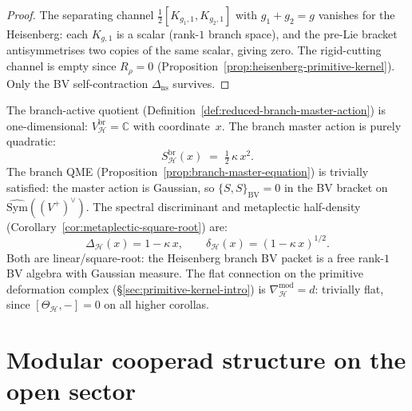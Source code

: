 \begin{proof}
The separating channel
$\frac{1}{2}[K_{g_1,1}, K_{g_2,1}]$ with $g_1 + g_2 = g$
vanishes for the Heisenberg: each $K_{g,1}$ is a scalar
(rank-$1$ branch space), and the pre-Lie bracket antisymmetrises
two copies of the same scalar, giving zero. The rigid-cutting
channel is empty since $R_\rho = 0$
(Proposition~\ref{prop:heisenberg-primitive-kernel}). Only the
BV self-contraction $\Delta_{\mathrm{ns}}$ survives.
\end{proof}

\begin{computation}
\label{comp:heisenberg-branch-bv}
The branch-active quotient
\textup{(}Definition~\textup{\ref{def:reduced-branch-master-action})}
is one-dimensional: $V_{\mathcal{H}}^{\mathrm{br}} = \mathbb{C}$
with coordinate~$x$. The branch master action is purely quadratic:
\begin{equation}\label{eq:heisenberg-branch-action}
S_{\mathcal{H}}^{\mathrm{br}}(x)
\;=\;
\tfrac{1}{2}\,\kappa\,x^2.
\end{equation}
The branch QME
\textup{(}Proposition~\textup{\ref{prop:branch-master-equation})}
is trivially satisfied: the master action is Gaussian, so
$\{S,S\}_{\mathrm{BV}} = 0$ in the BV bracket on
$\widehat{\mathrm{Sym}}((V^+)^\vee)$.
The spectral discriminant and metaplectic half-density
\textup{(}Corollary~\textup{\ref{cor:metaplectic-square-root})}
are:
\begin{equation}\label{eq:heisenberg-metaplectic}
\Delta_{\mathcal{H}}(x) = 1 - \kappa\,x,
\qquad
\delta_{\mathcal{H}}(x) = (1 - \kappa\,x)^{1/2}.
\end{equation}
Both are linear/square-root: the Heisenberg branch BV packet is a
free rank-$1$ BV algebra with Gaussian measure. The flat connection
on the primitive deformation complex
\textup{(}\S\textup{\ref{sec:primitive-kernel-intro})}
is $\nabla^{\mathrm{mod}}_{\mathcal{H}} = d$: trivially flat,
since $[\Theta_{\mathcal{H}}, -] = 0$ on all higher corollas.
\end{computation}

\section{Modular cooperad structure on the open sector}
\label{sec:heisenberg-modular-cooperad}

